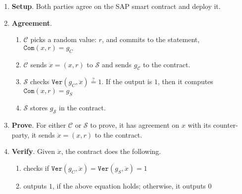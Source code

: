  \begin{enumerate}
 \item\textbf{Setup}.  Both parties agree on the SAP smart contract and deploy it.

  
    \item\textbf{Agreement}.
  \begin{enumerate}
   \item $\mathcal C$ picks a random value: $r$, and commits to the statement, $\mathtt{Com}(x,r)=g_{\scriptscriptstyle C}$
   
   
   \item $\mathcal C$ sends $\ddot{x}=(x,r)$  to  $\mathcal S$ and sends $g_{\scriptscriptstyle\mathcal C}$ to the contract. 
   \item $\mathcal S$ checks $\mathtt{Ver}(g_{\scriptscriptstyle C}, \ddot{x})\stackrel{?}=1$. If the output is $1$, then  it computes $\mathtt{Com}(x,r)=g_{\scriptscriptstyle S}$
   
   \item $\mathcal S$   stores $g_{\scriptscriptstyle\mathcal S}$ in the contract. 
    \end{enumerate}
   \item\textbf{Prove}. For either $\mathcal C$ or $\mathcal S$ to prove, it has agreement on $x$ with its counter-party, it sends $\ddot{x}=(x, r)$  to the contract. 
 \item\textbf{Verify}. Given $\ddot{x}$, the contract does the following. 
   \begin{enumerate}

   \item checks if $\mathtt{Ver}(g_{\scriptscriptstyle C},\ddot{x})=\mathtt{Ver}(g_{\scriptscriptstyle S},\ddot{x}) =1$
   
   \item outputs $1$, if the above equation holds; otherwise, it outputs $0$
    \end{enumerate}
 \end{enumerate}

  
  
  
  
